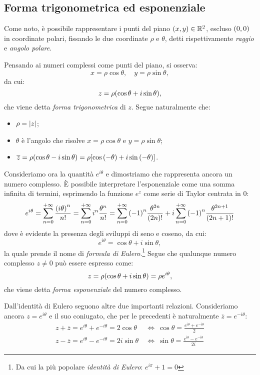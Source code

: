     \subsection{Forma trigonometrica ed esponenziale}
        Come noto, \`e possibile rappresentare i punti del piano $\qty(x,y)\in\mathbb{R}^2$, escluso $\qty(0,0)$ in coordinate polari, fissando le due coordinate $\rho$ e $\theta$, detti rispettivamente \emph{raggio} e \emph{angolo polare}. \par Pensando ai numeri complessi come punti del piano, si osserva: $$x=\rho\cos\theta,\quad y=\rho\sin\theta,$$ da cui: $$z=\rho\qty(\cos\theta+i\sin\theta),$$ che viene detta \emph{forma trigonometrica} di $z$. Segue naturalmente che:
        \begin{itemize}
            \item $\rho=\abs{z}$;
            \item $\theta$ \`e l'angolo che risolve $x=\rho\cos\theta$ e $y=\rho\sin\theta$;
            \item $\overline{z}=\rho\qty(\cos\theta-i\sin\theta)=\rho\qty[\cos\qty(-\theta)+i\sin\qty(-\theta)]$.
        \end{itemize}
        \par Consideriamo ora la quantit\`a $e^{i\theta}$ e dimostriamo che rappresenta ancora un numero complesso. \`E possibile interpretare l'esponenziale come una somma infinita di termini, esprimendo la funzione $e^z$ come serie di Taylor centrata in $0$: $$e^{i\theta}=\sum_{n=0}^{+\infty}\frac{\qty(i\theta)^n}{n!}=\sum_{n=0}^{+\infty}i^n\frac{\theta^n}{n!}=\sum_{n=0}^{+\infty}\qty(-1)^n\frac{\theta^{2n}}{\qty(2n)!}+i\sum_{n=0}^{+\infty}\qty(-1)^n\frac{\theta^{2n+1}}{\qty(2n+1)!}$$ dove \`e evidente la presenza degli sviluppi di seno e coseno, da cui: 
        \begin{equation}
            e^{i\theta}=\cos\theta+i\sin\theta,
            \label{eq:euler:1}
        \end{equation}
        la quale prende il nome di \emph{formula di Eulero}.\footnote{Da cui la pi\`u popolare \emph{identit\`a di Eulero}: $e^{i\pi}+1=0$} Segue che qualunque numero complesso $z\neq 0$ pu\`o essere espresso come: $$z=\rho\qty(\cos\theta+i\sin\theta)=\rho e^{i\theta},$$ che viene detta \emph{forma esponenziale} del numero complesso. \par Dall'identit\`a di Eulero seguono altre due importanti relazioni. Consideriamo ancora $z=e^{i\theta}$ e il suo coniugato, che per le precedenti \`e naturalmente $\overline{z}=e^{-i\theta}$:
        \begin{align}
            z+\overline{z}=e^{i\theta}+e^{-i\theta}=2\cos\theta\ &\iff\ \cos\theta=\frac{e^{i\theta}+e^{-i\theta}}{2}\\
            z-\overline{z}=e^{i\theta}-e^{-i\theta}=2i\sin\theta\ &\iff\ \sin\theta=\frac{e^{i\theta}-e^{-i\theta}}{2i}
        \end{align}
